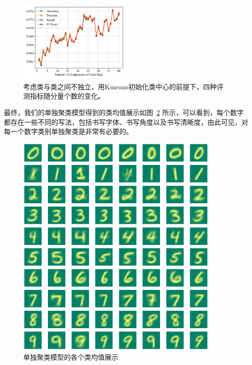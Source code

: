 \documentclass[UTF8]{ctexart}
\begin{document}
\begin{figure}[!h]
  \centering
  \includegraphics[width=0.5\textwidth]{figures/4metric.pdf}
  \caption{考虑类与类之间不独立，用Kmeans初始化类中心的前提下，四种评测指标随分量个数的变化。}\label{fig:2-4metrics}
\end{figure}

最终，我们的单独聚类模型得到的类均值展示如图~\ref{fig:2-class_means} 所示，可以看到，每个数字都存在一些不同的写法，包括书写字体、书写角度以及书写清晰度，由此可见，对每一个数字类别单独聚类是非常有必要的。

\begin{figure}[!h]
  \centering
  \includegraphics[width=0.9\textwidth]{figures/digits.pdf}
  \vspace{-.3cm}\caption{单独聚类模型的各个类均值展示}\label{fig:2-class_means}
\end{figure}
\end{document}
